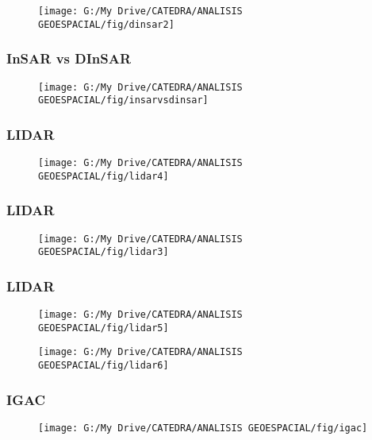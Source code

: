 \documentclass[14pt]{beamer}
\begin{document}
\begin{frame}
 \begin{figure}
    \centering
    \texttt{[image: G:/My Drive/CATEDRA/ANALISIS GEOESPACIAL/fig/dinsar2]}
  \end{figure}
\end{frame}
\begin{frame}
\frametitle{InSAR vs DInSAR}
 \begin{figure}
    \centering
    \texttt{[image: G:/My Drive/CATEDRA/ANALISIS GEOESPACIAL/fig/insarvsdinsar]}
  \end{figure}
\end{frame}
\begin{frame}
\frametitle{LIDAR}
 \begin{figure}
    \centering
    \texttt{[image: G:/My Drive/CATEDRA/ANALISIS GEOESPACIAL/fig/lidar4]}
  \end{figure}
\end{frame}
\begin{frame}
\frametitle{LIDAR}
 \begin{figure}
    \centering
    \texttt{[image: G:/My Drive/CATEDRA/ANALISIS GEOESPACIAL/fig/lidar3]}
  \end{figure}
\end{frame}
\begin{frame}
\frametitle{LIDAR}
 \begin{figure}
    \centering
    \texttt{[image: G:/My Drive/CATEDRA/ANALISIS GEOESPACIAL/fig/lidar5]}
  \end{figure}
\end{frame}
\begin{frame} 
 \begin{figure}
    \centering
    \texttt{[image: G:/My Drive/CATEDRA/ANALISIS GEOESPACIAL/fig/lidar6]}
  \end{figure}
\end{frame}
\begin{frame}
\frametitle{IGAC}
 \begin{figure}
    \centering
    \texttt{[image: G:/My Drive/CATEDRA/ANALISIS GEOESPACIAL/fig/igac]}
  \end{figure}
\end{frame}
\end{document}
